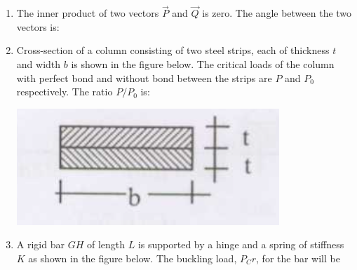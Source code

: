\documentclass[journal]{IEEEtran}
\begin{document}
\begin{enumerate}
\item The inner  product of two vectors $\vec{P}$ and $\vec{Q}$ is zero. The angle  between the two vectors is: \hfill {}
\begin{enumerate}
\end{enumerate}

\item Cross-section of a column consisting of two steel strips, each of thickness $t$ and width $b$ is shown in the figure below. The critical loads of the column with perfect bond and without bond between the strips are $P$ and $P_0$ respectively. The ratio $P/P_0$ is: \hfill {}
\vspace{0.1cm}

\includegraphics[width=0.6\columnwidth]{figs/fig14.png} 

\begin{enumerate}
\end{enumerate}

\item A rigid bar $GH$ of length $L$ is supported by a hinge and a spring of stiffness $K$ as shown in the figure below. The buckling load, $P_Cr$, for the bar will be  \hfill {}


\end{enumerate}
\end{document}
